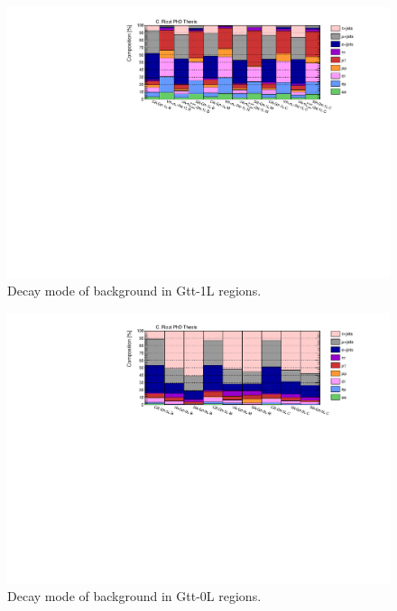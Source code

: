 \begin{figure}[htbp]
\includegraphics[width=\textwidth]{figures/strong_prod/comp_plots/Gtt_1L_tt.pdf}
\caption{Decay mode of \ttbar background in Gtt-1L regions.}
	\label{fig:ttcomp_Gtt1L}
\end{figure}

\begin{figure}[htbp]
\includegraphics[width=\textwidth]{figures/strong_prod/comp_plots/Gtt_0L_tt.pdf}
\caption{Decay mode of \ttbar background in Gtt-0L regions.}
	\label{fig:ttcomp_Gtt0L}
\end{figure}

